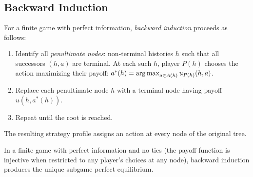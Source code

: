 \documentclass[11pt,a4paper]{article}
\begin{document}
\subsection{Backward Induction}
\label{subsec:backward_induction}

\begin{definition}
\label{def:backward_induction}
For a finite game with perfect information, \emph{backward induction}
proceeds as follows:
\begin{enumerate}[nosep]
    \item Identify all \emph{penultimate nodes}: non-terminal histories $h$
    such that all successors $(h, a)$ are terminal. At each such $h$, player
    $P(h)$ chooses the action maximizing their payoff:
    $a^*(h) = \operatorname{arg\,max}_{a \in A(h)} u_{P(h)}(h, a)$.
    \item Replace each penultimate node $h$ with a terminal node having payoff
    $u(h, a^*(h))$.
    \item Repeat until the root is reached.
\end{enumerate}
The resulting strategy profile assigns an action at every node of the
original tree.
\end{definition}

\begin{keyresult}
\begin{theorem}
\label{thm:bi_spe}
In a finite game with perfect information and no ties (the payoff function
is injective when restricted to any player's choices at any node), backward
induction produces the unique subgame perfect equilibrium.
\end{theorem}
\end{keyresult}
\end{document}
